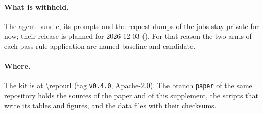 \paragraph{What is withheld.}
The agent bundle, its prompts and the request dumps of the jobs stay private for now; their release is planned for
2026-12-03 (). For that reason the two arms of each pass-rule application are named baseline and candidate.

\paragraph{Where.}
The kit is at \url{\repourl} (tag \texttt{v0.4.0}, Apache-2.0). The branch \texttt{paper} of the same repository holds
the sources of the paper and of this supplement, the scripts that write its tables and figures, and the data files
with their checksums.




